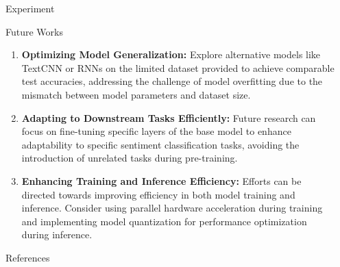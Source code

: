 \documentclass[final]{beamer}
\newlength{\sepwidth}
\newlength{\colwidth}
\newcommand{\separatorcolumn}{\begin{column}{\sepwidth}\end{column}}
\begin{document}
\begin{frame}[t]
\begin{columns}[t]
\begin{column}{\colwidth}
\begin{block}{Experiment}
  \end{block}

    \begin{block}{Future Works}

\begin{enumerate}
    \item \textbf{Optimizing Model Generalization:} Explore alternative models like TextCNN or RNNs on the limited dataset provided to achieve comparable test accuracies, addressing the challenge of model overfitting due to the mismatch between model parameters and dataset size.
    
    \item \textbf{Adapting to Downstream Tasks Efficiently:} Future research can focus on fine-tuning specific layers of the base model to enhance adaptability to specific sentiment classification tasks, avoiding the introduction of unrelated tasks during pre-training.
    
    \item \textbf{Enhancing Training and Inference Efficiency:} Efforts can be directed towards improving efficiency in both model training and inference. Consider using parallel hardware acceleration during training and implementing model quantization for performance optimization during inference.
\end{enumerate}


  \end{block}



  \begin{block}{References}
    \nocite{*}
    \footnotesize{}

  \end{block}

\end{column}

\separatorcolumn
\end{columns}
\end{frame}
\end{document}
